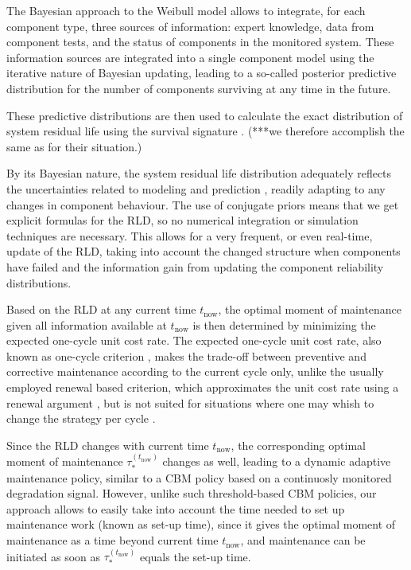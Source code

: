 \documentclass[authoryear]{elsarticle}
\def\tnow{t_\text{now}}
\newcommand{\tausnow}{\tau_*^{(\tnow)}}
\begin{document}
The Bayesian approach to the Weibull model \citep[see, e.g.,][]{1996:mazzuchi-soyer} allows to integrate, for each component type,
three sources of information: expert knowledge, data from component tests,
and the status of components in the monitored system. %
These information sources are integrated into a single component model
using the iterative nature of Bayesian updating,
leading to a so-called posterior predictive distribution for the number of components surviving at any time in the future.

These predictive distributions are then used to calculate the exact distribution of system residual life
using the survival signature \citep{2012:survsign}.
(***we therefore accomplish the same as \cite{2013:si-et-al} for their situation.)

By its Bayesian nature, the system residual life distribution adequately reflects the uncertainties %
related to modeling and prediction \citep{2015:sankararaman},
readily adapting to any changes in component behaviour.
The use of conjugate priors means that we get explicit formulas for the RLD,
so no numerical integration or simulation techniques are necessary.
This allows for a very frequent, or even real-time, update of the RLD,
taking into account the changed structure when components have failed
and the information gain from updating the component reliability distributions.

Based on the RLD at any current time $\tnow$,
the optimal moment of maintenance given all information available at $\tnow$
is then determined by minimizing the expected one-cycle unit cost rate.
The expected one-cycle unit cost rate, also known as one-cycle criterion
\citep{1984:ansell-bendell-humble,1996:mazzuchi-soyer,2006:coolen-schrijner-coolen},
makes the trade-off between preventive and corrective maintenance according to the current cycle only,
unlike the usually employed renewal based criterion,
which approximates the unit cost rate using a renewal argument \citep[p.~296]{1996:mazzuchi-soyer},
but is not suited for situations where one may whish to change the strategy per cycle \citep{2006:coolen-schrijner-coolen}.

Since the RLD changes with current time $\tnow$,
the corresponding optimal moment of maintenance $\tausnow$ changes as well,
leading to a dynamic adaptive maintenance policy,
similar to a CBM policy based on a continuosly monitored degradation signal.
However, unlike such threshold-based CBM policies,
our approach allows to easily take into account the time needed to set up maintenance work (known as set-up time),
since it gives the optimal moment of maintenance as a time beyond current time $\tnow$,
and maintenance can be initiated as soon as $\tausnow$ equals the set-up time.
\end{document}

